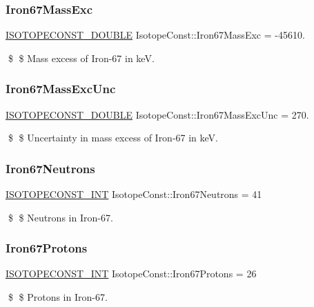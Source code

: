 \subsubsection{\texorpdfstring{Iron67\+Mass\+Exc}{Iron67MassExc}}
{\footnotesize\ttfamily \mbox{\hyperlink{group___isotope_const-_macros_ga8f45a7272ce02c0b4c65c44636ed719a}{I\+S\+O\+T\+O\+P\+E\+C\+O\+N\+S\+T\+\_\+\+D\+O\+U\+B\+LE}} Isotope\+Const\+::\+Iron67\+Mass\+Exc = -\/45610.}

\$ \$ Mass excess of Iron-\/67 in keV. \mbox{\label{group___isotope_const-_iron-_fe67_gaa00466830f0d4c23033dff5176c28757}} 
\subsubsection{\texorpdfstring{Iron67\+Mass\+Exc\+Unc}{Iron67MassExcUnc}}
{\footnotesize\ttfamily \mbox{\hyperlink{group___isotope_const-_macros_ga8f45a7272ce02c0b4c65c44636ed719a}{I\+S\+O\+T\+O\+P\+E\+C\+O\+N\+S\+T\+\_\+\+D\+O\+U\+B\+LE}} Isotope\+Const\+::\+Iron67\+Mass\+Exc\+Unc = 270.}

\$ \$ Uncertainty in mass excess of Iron-\/67 in keV. \mbox{\label{group___isotope_const-_iron-_fe67_ga4c54272213845cc0ddd581d516defbfa}} 
\subsubsection{\texorpdfstring{Iron67\+Neutrons}{Iron67Neutrons}}
{\footnotesize\ttfamily \mbox{\hyperlink{group___isotope_const-_macros_ga5f18360b3e99483a35c32d789e62621c}{I\+S\+O\+T\+O\+P\+E\+C\+O\+N\+S\+T\+\_\+\+I\+NT}} Isotope\+Const\+::\+Iron67\+Neutrons = 41}

\$ \$ Neutrons in Iron-\/67. \mbox{\label{group___isotope_const-_iron-_fe67_gaa5210e3b7420a4ed967f057b2b70e247}} 
\subsubsection{\texorpdfstring{Iron67\+Protons}{Iron67Protons}}
{\footnotesize\ttfamily \mbox{\hyperlink{group___isotope_const-_macros_ga5f18360b3e99483a35c32d789e62621c}{I\+S\+O\+T\+O\+P\+E\+C\+O\+N\+S\+T\+\_\+\+I\+NT}} Isotope\+Const\+::\+Iron67\+Protons = 26}

\$ \$ Protons in Iron-\/67. 